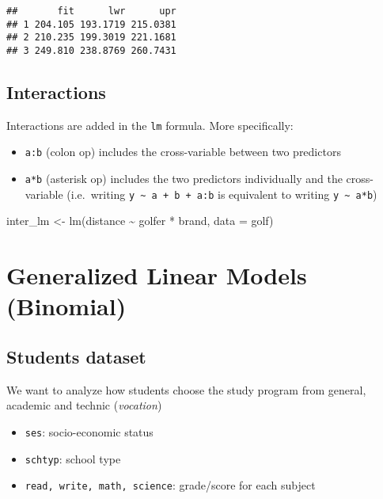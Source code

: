 \documentclass[
  oneside]{book}
\newenvironment{Shaded}{\begin{snugshade}}{\end{snugshade}}
\newcommand{\AttributeTok}[1]{\textcolor[rgb]{0.77,0.63,0.00}{#1}}
\newcommand{\FunctionTok}[1]{\textcolor[rgb]{0.00,0.00,0.00}{#1}}
\newcommand{\NormalTok}[1]{#1}
\newcommand{\OtherTok}[1]{\textcolor[rgb]{0.56,0.35,0.01}{#1}}
\newcommand{\SpecialCharTok}[1]{\textcolor[rgb]{0.00,0.00,0.00}{#1}}
\providecommand{\tightlist}{%
  \setlength{\itemsep}{0pt}\setlength{\parskip}{0pt}}
\begin{document}
\begin{verbatim}
##       fit      lwr      upr
## 1 204.105 193.1719 215.0381
## 2 210.235 199.3019 221.1681
## 3 249.810 238.8769 260.7431
\end{verbatim}

\hypertarget{interactions}{%
\section{Interactions}\label{interactions}}

Interactions are added in the \texttt{lm} formula. More specifically:

\begin{itemize}
\tightlist
\item
  \texttt{a:b} (colon op) includes the cross-variable between two predictors
\item
  \texttt{a*b} (asterisk op) includes the two predictors individually and the
  cross-variable (i.e.~writing \texttt{y\ \textasciitilde{}\ a\ +\ b\ +\ a:b} is equivalent to
  writing \texttt{y\ \textasciitilde{}\ a*b})
\end{itemize}

\begin{Shaded}
\begin{Highlighting}[]
\NormalTok{inter\_lm }\OtherTok{\textless{}{-}} \FunctionTok{lm}\NormalTok{(distance }\SpecialCharTok{\textasciitilde{}}\NormalTok{ golfer }\SpecialCharTok{*}\NormalTok{ brand, }\AttributeTok{data =}\NormalTok{ golf)}
\end{Highlighting}
\end{Shaded}

\hypertarget{generalized-linear-models-binomial}{%
\chapter{Generalized Linear Models (Binomial)}\label{generalized-linear-models-binomial}}

\hypertarget{students-dataset}{%
\section{Students dataset}\label{students-dataset}}

We want to analyze how students choose the study program
from general, academic and technic (\emph{vocation})

\begin{itemize}
\tightlist
\item
  \texttt{ses}: socio-economic status
\item
  \texttt{schtyp}: school type
\item
  \texttt{read,\ write,\ math,\ science}: grade/score for each subject
\end{itemize}
\end{document}
